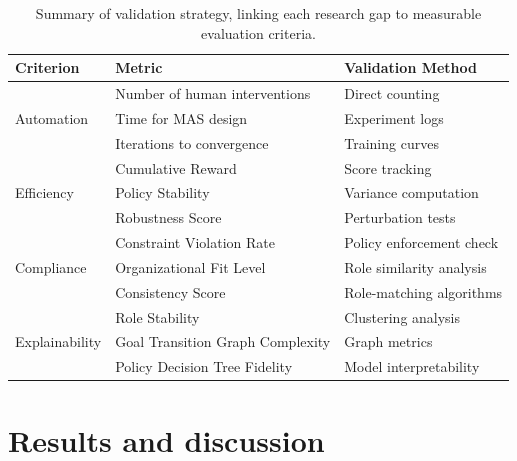 \documentclass[pdflatex,sn-mathphys-num]{sn-jnl}%
\theoremstyle{thmstyleone}%
\theoremstyle{thmstyletwo}%
\theoremstyle{thmstylethree}%
\begin{document}
\begin{table}[h!]
    \centering
    \begin{tabular}{|l|l|l|}
        \hline
        \textbf{Criterion}              & \textbf{Metric}                  & \textbf{Validation Method} \\
        \hline
        \multirow{3}{*}{Automation}     & Number of human interventions    & Direct counting            \\
                                        & Time for MAS design              & Experiment logs            \\
                                        & Iterations to convergence        & Training curves            \\
        \hline
        \multirow{3}{*}{Efficiency}     & Cumulative Reward                & Score tracking             \\
                                        & Policy Stability                 & Variance computation       \\
                                        & Robustness Score                 & Perturbation tests         \\
        \hline
        \multirow{3}{*}{Compliance}     & Constraint Violation Rate        & Policy enforcement check   \\
                                        & Organizational Fit Level         & Role similarity analysis   \\
                                        & Consistency Score                & Role-matching algorithms   \\
        \hline
        \multirow{3}{*}{Explainability} & Role Stability                   & Clustering analysis        \\
                                        & Goal Transition Graph Complexity & Graph metrics              \\
                                        & Policy Decision Tree Fidelity    & Model interpretability     \\
        \hline
    \end{tabular}
    \caption{Summary of validation strategy, linking each research gap to measurable evaluation criteria.}
\end{table}





\section{Results and discussion} \label{sec:results}
\end{document}
